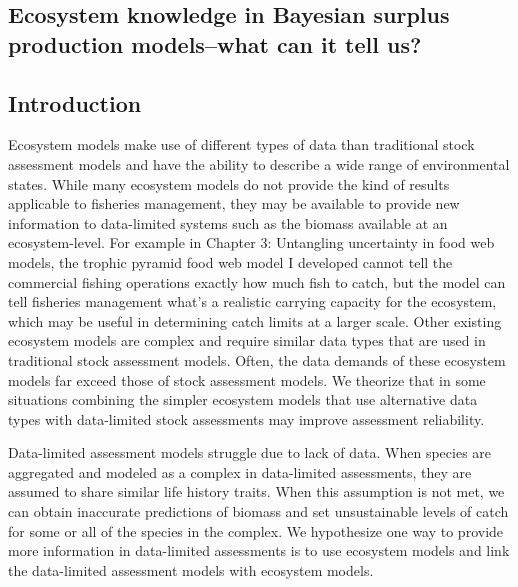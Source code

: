 \documentclass[oneside,12pt,final]{sty/ucthesis-CA2012}
\begin{document}
\begin{mainmatter}
\chapter{Ecosystem knowledge in Bayesian surplus production models--what can it tell us?}

\section{Introduction}
Ecosystem models make use of different types of data than traditional stock assessment models and have the ability to describe a wide range of environmental states. While many ecosystem models do not provide the kind of results applicable to fisheries management, they may be available to provide new information to data-limited systems such as the biomass available at an ecosystem-level. For example in Chapter 3: Untangling uncertainty in food web models, the trophic pyramid food web model I developed cannot tell the commercial fishing operations exactly how much fish to catch, but the model can tell fisheries management what's a realistic carrying capacity for the ecosystem, which may be useful in determining catch limits at a larger scale. Other existing ecosystem models are complex and require similar data types that are used in traditional stock assessment models. Often, the data demands of these ecosystem models far exceed those of stock assessment models. We theorize that in some situations combining the simpler ecosystem models that use alternative data types with data-limited stock assessments may improve assessment reliability. 

\vspace{5mm}

Data-limited assessment models struggle due to lack of data. When species are aggregated and modeled as a complex in data-limited assessments, they are assumed to share similar life history traits. When this assumption is not met, we can obtain inaccurate predictions of biomass and set unsustainable levels of catch for some or all of the species in the complex. We hypothesize one way to provide more information in data-limited assessments is to use ecosystem models and link the data-limited assessment models with ecosystem models. 

\vspace{5mm}


\end{mainmatter}
\end{document}
